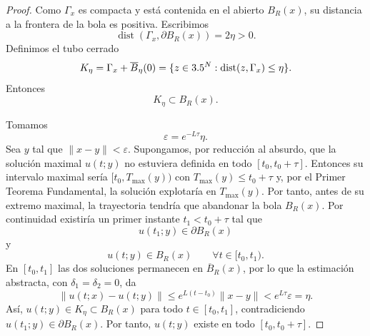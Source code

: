 \begin{proof}
    Como $\Gamma_x$ es compacta y está contenida en el abierto $B_R(x)$, su distancia a la frontera de la bola es positiva. Escribimos
    \[
        \operatorname{dist}(\Gamma_x,\partial B_R(x))=2\eta>0.
    \]
    Definimos el tubo cerrado
    \[
        K_\eta=\Gamma_x+\overline{B}_\eta(0)
        =\{z\in3.5^N:\operatorname{dist}(z,\Gamma_x)\leq\eta\}.
    \]
    Entonces
    \[
        K_\eta\subset B_R(x).
    \]

    \begin{center}
    \end{center}

    Tomamos
    \[
        \varepsilon=e^{-L\tau}\eta.
    \]
    Sea $y$ tal que $\|x-y\|<\varepsilon$. Supongamos, por reducción al absurdo, que la solución maximal $u(t;y)$ no estuviera definida en todo $[t_0,t_0+\tau]$. Entonces su intervalo maximal sería $[t_0, T_{\max}(y))$ con $T_{\max}(y) \leq t_0 + \tau$ y, por el Primer Teorema Fundamental, la solución explotaría en $T_{\max}(y)$. Por tanto, antes de su extremo maximal, la trayectoria tendría que abandonar la bola $B_R(x)$. Por continuidad existiría un primer instante $t_1<t_0+\tau$ tal que
    \[
        u(t_1;y)\in\partial B_R(x)
    \]
    y
    \[
        u(t;y)\in B_R(x)
        \qquad \forall t\in[t_0,t_1).
    \]
    En $[t_0,t_1]$ las dos soluciones permanecen en $\overline{B}_R(x)$, por lo que la estimación abstracta, con $\delta_1=\delta_2=0$, da
    \[
        \|u(t;x)-u(t;y)\|
        \leq e^{L(t-t_0)}\|x-y\|
        <e^{L\tau}\varepsilon
        =\eta.
    \]
    Así, $u(t;y)\in K_\eta\subset B_R(x)$ para todo $t\in[t_0,t_1]$, contradiciendo $u(t_1;y)\in\partial B_R(x)$. Por tanto, $u(t;y)$ existe en todo $[t_0,t_0+\tau]$.


\end{proof}
